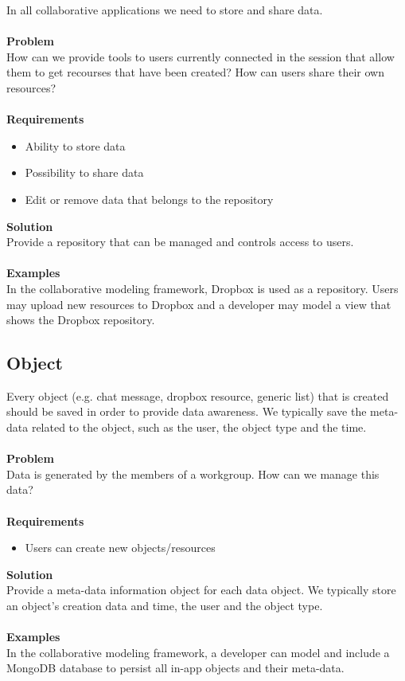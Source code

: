 In all collaborative applications we need to store and share data.
\\ \\
\textbf{Problem}
\\
How can we provide tools to users currently connected in the session that allow them to get recourses that have been created? How can users share their own resources?
\\ \\
\textbf{Requirements}
\begin{itemize}
\item{Ability to store data}
\item{Possibility to share data}
\item{Edit or remove data that belongs to the repository}
\end{itemize}
\textbf{Solution}
\\
Provide a repository that can be managed and controls access to users.
\\ \\
\textbf{Examples}
\\
In the collaborative modeling framework, Dropbox is used as a repository. Users may upload new resources to Dropbox and a developer may model a view that shows the Dropbox repository.

\subsection{Object}

Every object (e.g. chat message, dropbox resource, generic list) that is created should be saved in order to provide data awareness. We typically save the meta-data related to the object, such as the user, the object type and the time.
\\ \\
\textbf{Problem}
\\
Data is generated by the members of a workgroup. How can we manage this data?
\\ \\
\textbf{Requirements}
\begin{itemize}
\item{Users can create new objects/resources}
\end{itemize}
\textbf{Solution}
\\
Provide a meta-data information object for each data object. We typically store an object's creation data and time, the user and the object type.
\\ \\
\textbf{Examples}
\\
In the collaborative modeling framework, a developer can model and include a MongoDB \cite{MongoDB} database to persist all in-app objects and their meta-data. 

